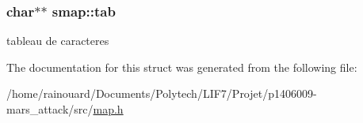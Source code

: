 \subsubsection[{\texorpdfstring{tab}{tab}}]{\setlength{\rightskip}{0pt plus 5cm}char$\ast$$\ast$ smap\+::tab}\hypertarget{structsmap_a464023235f8698b3df6a40b3f5a56d8d}{}\label{structsmap_a464023235f8698b3df6a40b3f5a56d8d}
tableau de caracteres 

The documentation for this struct was generated from the following file\+:\begin{DoxyCompactItemize}
\item 
/home/rainouard/\+Documents/\+Polytech/\+L\+I\+F7/\+Projet/p1406009-\/mars\+\_\+attack/src/\hyperlink{map_8h}{map.\+h}\end{DoxyCompactItemize}
